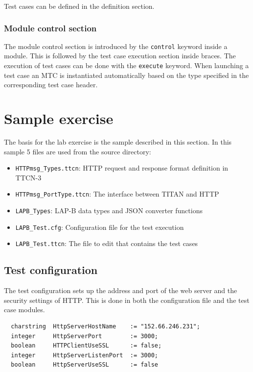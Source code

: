 \documentclass[a4paper]{article}
\begin{document}
Test cases can be defined in the definition section.

\subsubsection{Module control section}

The module control section is introduced by the \verb/control/ keyword inside a module. This is followed
by the test case execution section inside braces. The execution of test cases can be done with the
\verb/execute/ keyword. When launching a test case an MTC is instantiated automatically based on the type
specified in the corresponding test case header.

\section{Sample exercise}

The basis for the lab exercise is the sample described in this section. In this sample 5 files are used from the source
directory:
\begin{itemize}
    \item \verb/HTTPmsg_Types.ttcn/:  HTTP request and response format definition in TTCN-3
    \item \verb/HTTPmsg_PortType.ttcn/: The interface between TITAN and HTTP
    \item \verb!LAPB_Types!: LAP-B data types and JSON converter functions
    \item \verb!LAPB_Test.cfg!: Configuration file for the test execution
    \item \verb!LAPB_Test.ttcn!: The file to edit that contains the test cases
\end{itemize}

\subsection{Test configuration}
The test configuration sets up the address and port of the web server and the security settings of HTTP. This is done
in both the configuration file and the test case modules.

{\footnotesize
\begin{lstlisting}
  charstring  HttpServerHostName    := "152.66.246.231";
  integer     HttpServerPort        := 3000;
  boolean     HTTPClientUseSSL      := false;
  integer     HttpServerListenPort  := 3000;
  boolean     HttpServerUseSSL      := false
\end{lstlisting}
}
\end{document}
